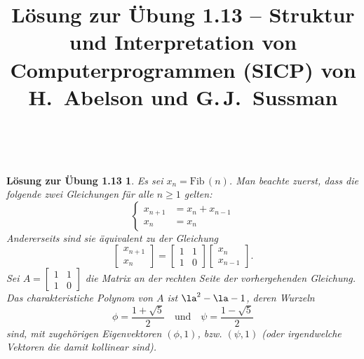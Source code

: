 \documentclass[a4paper,11pt,reqno]{amsart}
\theoremstyle{uremark}
\newtheorem*{loes}{L\"osung zur \"Ubung 1.13}
\begin{document}
\title[]{L\"osung zur \"Ubung 1.13 -- Struktur und Interpretation von
Computerprogrammen (SICP) von H.~Abelson und G.\,J.~Sussman}
\author{\href{https://github.com/pzuehlke}{}}
\maketitle
\


\begin{loes} 
    Es sei $ x_n = \text{Fib}\,(n) $. Man beachte zuerst, dass die folgende
    zwei Gleichungen f\"ur alle $ n \ge 1 $ gelten:
    \begin{equation*}%
        \begin{cases}
            x_{n + 1} & = x_{n} + x_{n - 1} \\
            x_n & = x_n
        \end{cases}
    \end{equation*}
    Andererseits sind sie \"aquivalent zu der Gleichung
    \begin{equation*}%
        \begin{bmatrix}
            x_{n + 1} \\
            x_n
        \end{bmatrix} =\begin{bmatrix}
            1 & 1 \\
            1 & 0 
        \end{bmatrix}
        \begin{bmatrix}
            x_n \\
            x_{n - 1}
        \end{bmatrix}.
        \end{equation*}
        Sei $ A = \begin{bmatrix}
            1 & 1 \\
            1 & 0 
        \end{bmatrix} $ die Matrix an der rechten Seite der vorhergehenden
        Gleichung. Das
        charakteristiche Polynom von $ A $ ist $ \la^2 - \la - 1 $, deren
        Wurzeln
        \begin{equation*}%
            \phi = \frac{1 + \sqrt{5}}{2} \quad \text{und} \quad \psi = \frac{1
            - \sqrt{5}}{2}
        \end{equation*}
        sind, mit zugeh\"origen Eigenvektoren $ (\phi, 1) $, bzw. $ (\psi, 1) $
        (oder irgendwelche Vektoren die damit kollinear sind).


\end{loes}
\end{document}
